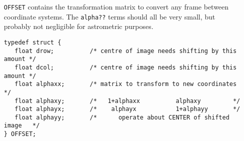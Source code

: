 {\begin{itemize}
\item[{\tt OFFSET}]
contains the transformation matrix to convert any frame
between coordinate systems. The {\tt alpha??} terms should all be very small,
but probably not negligible for astrometric purposes.
\begin{verbatim}
typedef struct {
   float drow;          /* centre of image needs shifting by this amount */
   float dcol;          /* centre of image needs shifting by this amount */
   float alphaxx;       /* matrix to transform to new coordinates */
   float alphaxy;       /*   1+alphaxx          alphaxy         */ 
   float alphayx;       /*    alphayx           1+alphayy       */
   float alphayy;       /*      operate about CENTER of shifted image   */
} OFFSET;
\end{verbatim}
\end{itemize}
}				%



